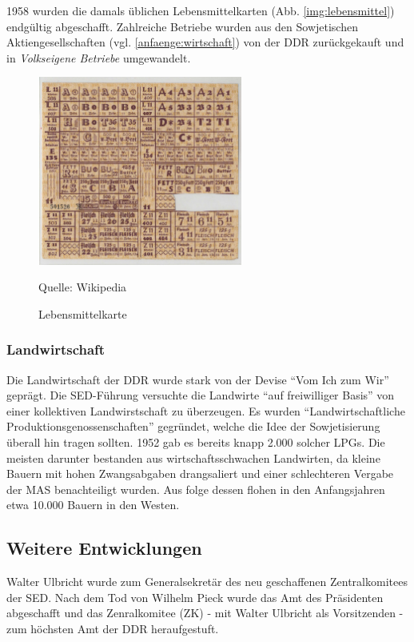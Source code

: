 \documentclass[12pt,a4paper]{article}
\begin{document}
1958 wurden die damals üblichen Lebensmittelkarten (Abb. \ref{img:lebensmittel}) endgültig abgeschafft. Zahlreiche Betriebe wurden aus den Sowjetischen Aktiengesellschaften (vgl. \ref{anfaenge:wirtschaft}) von der DDR zurückgekauft und in \textit{Volkseigene Betriebe} umgewandelt.

\begin{figure}[hbp]
    \centering
    \includegraphics[width=0.6\textwidth]{Bilder/Lebensm1.JPG}
    \caption{Lebensmittelkarte}
    Quelle: Wikipedia
    \label{img:lebensmittelk}
\end{figure}


\subsubsection{Landwirtschaft}
\label{landwirtschaft}

Die Landwirtschaft der DDR wurde stark von der Devise \enquote{Vom Ich zum Wir} geprägt. Die SED-Führung versuchte die Landwirte \enquote{auf freiwilliger Basis} von einer kollektiven Landwirstschaft zu überzeugen. Es wurden \enquote{Landwirtschaftliche Produktionsgenossenschaften} gegründet, welche die Idee der Sowjetisierung überall hin tragen sollten. 1952 gab es bereits knapp 2.000 solcher LPGs. Die meisten darunter bestanden aus wirtschaftsschwachen Landwirten, da kleine Bauern mit hohen Zwangsabgaben drangsaliert und einer schlechteren Vergabe der MAS benachteiligt wurden. Aus folge dessen flohen in den Anfangsjahren etwa 10.000 Bauern in den Westen.


\subsection{Weitere Entwicklungen}
\label{anfaenge:weiter}

Walter Ulbricht wurde zum Generalsekretär des neu geschaffenen Zentralkomitees der SED. Nach dem Tod von Wilhelm Pieck wurde das Amt des Präsidenten abgeschafft und das Zenralkomitee (ZK) - mit Walter Ulbricht als Vorsitzenden - zum höchsten Amt der DDR heraufgestuft.
\end{document}
